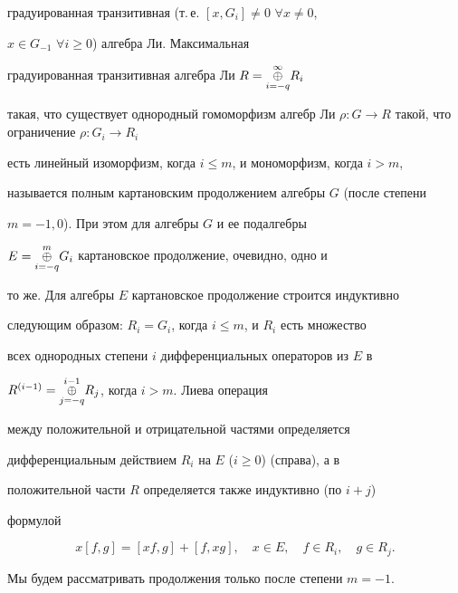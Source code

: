 градуированная транзитивная (т.\,е. $[x,G_i]\ne 0$ $\forall x\ne 0$, 


$x \in G_{-1}$ $\forall i \ge 0$) алгебра Ли. Максимальная


градуированная транзитивная алгебра Ли $R=\underset{i=-q}{\overset{\infty}{\oplus}}{}R_i$


такая, что существует однородный гомоморфизм алгебр Ли $\rho: G 


\to R$ такой, что ограничение $\rho: G_i \to R_i$


есть линейный изоморфизм, когда $i\le m$, и мономорфизм, когда $i>m$,


называется полным картановским продолжением алгебры $G$ (после степени


$m=-1,0$). При этом для алгебры $G$ и ее подалгебры


$E=\underset{i=-q}{\overset{m}{\oplus}}{}G_i$ картановское продолжение, очевидно, одно и


то же. Для алгебры $E$ картановское продолжение строится индуктивно


следующим образом: $R_i=G_i$, когда $i\le m$, и $R_i$ есть множество


всех однородных степени $i$ дифференциальных операторов из $E$ в


$R^{(i-1)}=\underset{j=-q}{\overset{i-1}{\oplus}}{}R_j$, когда $i>m$. Лиева операция


между положительной и отрицательной частями определяется


дифференциальным действием $R_i$ на $E$ ($i\ge 0$) (справа), а в


положительной части $R$ определяется также индуктивно (по $i+j$)


формулой


\begin{equation}\label{9}


x[f,g]=[xf,g]+[f,xg], \quad x\in E,\quad f\in R_i,\quad g\in R_j.


\end{equation}


Мы будем рассматривать продолжения только после степени $m=-1$.





